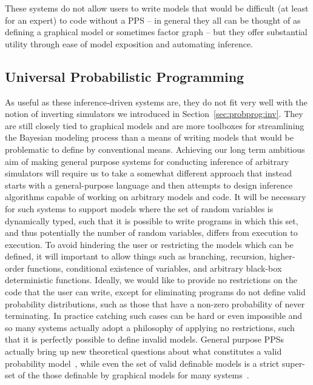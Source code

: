 These systems do not allow users to write models that would be difficult (at least for
an expert) to code without a PPS -- in general they all can be thought of as defining a graphical model
or sometimes factor graph -- but they offer substantial utility through ease of model exposition and
automating inference.

\subsection{Universal Probabilistic Programming}
\label{sec:probprog:two:general}

As useful as these inference-driven systems are, they do not fit very well with the notion of
inverting simulators we introduced in Section~\ref{sec:probprog:inv}.  They are still closely tied
to graphical models and are more toolboxes for streamlining the Bayesian modeling process than
a means of writing models that would be problematic to define by conventional means.  Achieving
our long term ambitious aim of making general purpose systems for conducting inference of
arbitrary simulators will require us to take a somewhat different approach that instead starts
with a general-purpose language and then attempts to design inference algorithms capable of
working on arbitrary models and code.  It will be necessary for such systems to
support models where the set of random variables is dynamically typed, such that it is possible 
to write programs in which this set, and thus potentially the number of random variables, differs 
from execution to execution.  To avoid hindering the user or restricting the models which can be
defined, it will important to allow 
things such as branching, recursion, higher-order functions,
conditional existence of variables, and arbitrary black-box
deterministic functions.  Ideally, we would like to provide no restrictions on the code that the user
can write, except for eliminating programs do not define valid probability distributions, such as
those that have a non-zero probability of never terminating.  In practice catching such cases can
be hard or even impossible and so many systems actually adopt a philosophy of applying no restrictions,
such that it is perfectly possible to define invalid models.  General purpose PPSs actually bring up new
theoretical questions about what constitutes a valid probability model~\citep{heunen2017convenient}, while
even the set of valid definable models is a strict super-set of the those definable by graphical models 
for many systems~\citep{goodman2013principles}.

